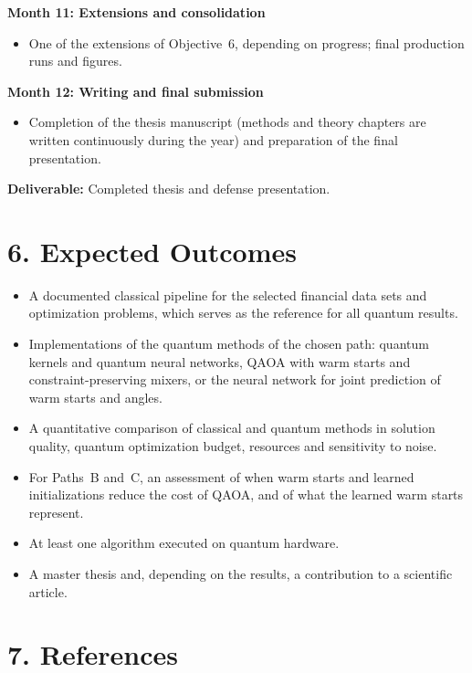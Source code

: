\documentclass[12pt,a4paper]{article}
\begin{document}
\bigskip

\textbf{Month 11: Extensions and consolidation}
\begin{itemize}
    \item One of the extensions of Objective~6, depending on progress;
    final production runs and figures.
\end{itemize}

\bigskip

\textbf{Month 12: Writing and final submission}
\begin{itemize}
    \item Completion of the thesis manuscript (methods and theory
    chapters are written continuously during the year) and
    preparation of the final presentation.
\end{itemize}
\textbf{Deliverable:} Completed thesis and defense presentation.

\section*{6. Expected Outcomes}

\begin{itemize}
    \item A documented classical pipeline for the selected financial
    data sets and optimization problems, which serves as the reference
    for all quantum results.
    \item Implementations of the quantum methods of the chosen path:
    quantum kernels and quantum neural networks, QAOA with warm starts
    and constraint-preserving mixers, or the neural network for joint
    prediction of warm starts and angles.
    \item A quantitative comparison of classical and quantum methods
    in solution quality, quantum optimization budget, resources and
    sensitivity to noise.
    \item For Paths~B and~C, an assessment of when warm starts and
    learned initializations reduce the cost of QAOA, and of what the
    learned warm starts represent.
    \item At least one algorithm executed on quantum hardware.
    \item A master thesis and, depending on the results, a
    contribution to a scientific article.
\end{itemize}

\section*{7. References}
\end{document}

